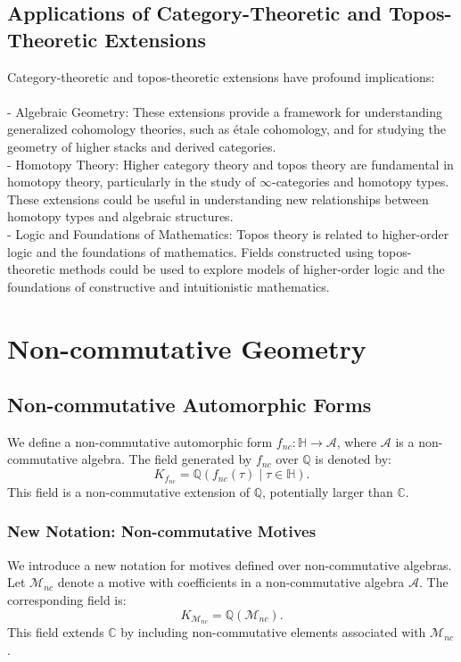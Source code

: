 \documentclass{article}
\begin{document}
\subsection{Applications of Category-Theoretic and Topos-Theoretic Extensions}
Category-theoretic and topos-theoretic extensions have profound implications:
{\ }\\
{\ }\\
- Algebraic Geometry: These extensions provide a framework for understanding generalized cohomology theories, such as étale cohomology, and for studying the geometry of higher stacks and derived categories.
{\ }\\
- Homotopy Theory: Higher category theory and topos theory are fundamental in homotopy theory, particularly in the study of $\infty$-categories and homotopy types. These extensions could be useful in understanding new relationships between homotopy types and algebraic structures.
{\ }\\
- Logic and Foundations of Mathematics: Topos theory is related to higher-order logic and the foundations of mathematics. Fields constructed using topos-theoretic methods could be used to explore models of higher-order logic and the foundations of constructive and intuitionistic mathematics.

\section{Non-commutative Geometry}
\subsection{Non-commutative Automorphic Forms}
We define a non-commutative automorphic form \(f_{nc}: \mathbb{H} \to \mathcal{A}\), where \(\mathcal{A}\) is a non-commutative algebra. The field generated by \(f_{nc}\) over \(\mathbb{Q}\) is denoted by:
\[
K_{f_{nc}} = \mathbb{Q}(f_{nc}(\tau) \mid \tau \in \mathbb{H}).
\]
This field is a non-commutative extension of \(\mathbb{Q}\), potentially larger than \(\mathbb{C}\).

\subsubsection{New Notation: Non-commutative Motives}
We introduce a new notation for motives defined over non-commutative algebras. Let \(\mathcal{M}_{nc}\) denote a motive with coefficients in a non-commutative algebra \(\mathcal{A}\). The corresponding field is:
\[
K_{\mathcal{M}_{nc}} = \mathbb{Q}(\mathcal{M}_{nc}).
\]
This field extends \(\mathbb{C}\) by including non-commutative elements associated with \(\mathcal{M}_{nc}\).
\end{document}
